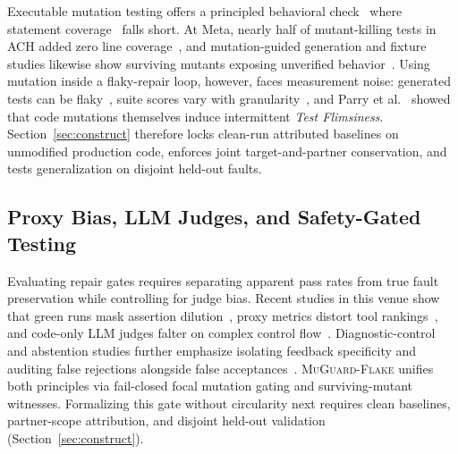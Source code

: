 Executable mutation testing offers a principled behavioral check~\cite{just2014mutants,papadakis2019mutation,du2026survivingmutants} where statement coverage~\cite{schuler2013checked,pizzorno2025coverup} falls short. At Meta, nearly half of mutant-killing tests in \textsc{ACH} added zero line coverage~\cite{alshahwan2024testgenllm,harman2025ach}, and mutation-guided generation and fixture studies likewise show surviving mutants exposing unverified behavior~\cite{dakhel2024mutap,li2024testboost,wang2026mutgen,lu2026beyondcoverage,alimadadi2026pytation}. Using mutation inside a flaky-repair loop, however, faces measurement noise: generated tests can be flaky~\cite{gruber2024generated}, suite scores vary with granularity~\cite{zhao2026correlation}, and Parry et al.~\cite{parry2026flimsiness} showed that code mutations themselves induce intermittent \emph{Test Flimsiness}. Section~\ref{sec:construct} therefore locks clean-run attributed baselines on unmodified production code, enforces joint target-and-partner conservation, and tests generalization on disjoint held-out faults.

\subsection{Proxy Bias, LLM Judges, and Safety-Gated Testing}

Evaluating repair gates requires separating apparent pass rates from true fault preservation while controlling for judge bias. Recent studies in this venue show that green runs mask assertion dilution~\cite{leunig2026perl}, proxy metrics distort tool rankings~\cite{bludau2026szz}, and code-only LLM judges falter on complex control flow~\cite{chou2026aijudge}. Diagnostic-control and abstention studies further emphasize isolating feedback specificity and auditing false rejections alongside false acceptances~\cite{zhang2026typerepair,salva2026nltestrunner}. \textsc{MuGuard-Flake} unifies both principles via fail-closed focal mutation gating and surviving-mutant witnesses. Formalizing this gate without circularity next requires clean baselines, partner-scope attribution, and disjoint held-out validation (Section~\ref{sec:construct}).
